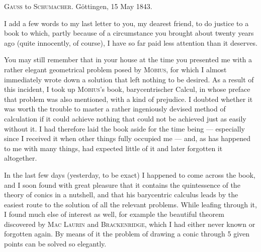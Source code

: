 \begin{center}\textsc{Gauss} to \textsc{Schumacher}. Göttingen, 15 May 1843.\end{center}

I add a few words to my last letter to you, my dearest friend,
to do justice to a book to which, partly because of a circumstance
you brought about twenty years ago (quite innocently, of course),
I have so far paid less attention than it deserves.

You may still remember that in your house at the time you presented me with a rather
elegant geometrical problem posed by \textsc{Möbius}, for which I
almost immediately wrote down a solution that left nothing to be desired. As a result
of this incident, I took up \textsc{Möbius}'s book, barycentrischer Calcul,
in whose preface that problem was also mentioned, with a kind of prejudice.
I doubted whether it was worth the trouble to master a rather ingeniously
devised method of calculation if it could achieve nothing that could not
be achieved just as easily without it. I had therefore laid the
book aside for the time being --- especially since I received it when other things
fully occupied me --- and, as has happened to me with many things, had expected little
of it and later forgotten it altogether.

In the last few days (yesterday, to be exact) I happened to come across the book,
and I soon found with great pleasure that it contains the quintessence
of the theory of conics in a nutshell, and that his
barycentric calculus leads by the easiest route to the solution of all the relevant
problems. While leafing through it, I found much else of interest as well,
for example the beautiful theorem discovered by \textsc{Mac Laurin} and \textsc{Brackenridge},
which I had either never known or forgotten again. By means of it
the problem of drawing a conic through 5 given points can be solved so
elegantly.
